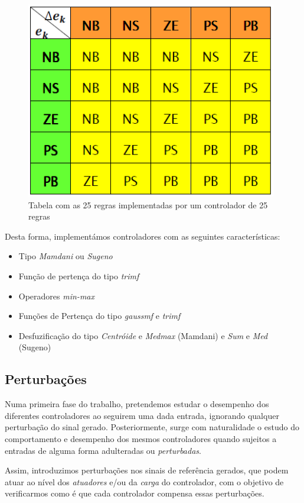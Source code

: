 \documentclass{article}
\begin{document}
\begin{figure}[H]
  \centering
      \includegraphics[scale=0.5]{Images/25_Rules.png}
  \caption{Tabela com as 25 regras implementadas por um controlador de 25 regras}
\end{figure}

Desta forma, implementámos controladores com as seguintes características:

\begin{itemize}
\item Tipo \emph{Mamdani} ou \emph{Sugeno}
\item Função de pertença do tipo \emph{trimf}
\item Operadores \emph{min-max}
\item Funções de Pertença do tipo \emph{gaussmf} e \emph{trimf}
\item Desfuzificação do tipo \emph{Centróide} e \emph{Medmax} (Mamdani) e \emph{Sum} e \emph{Med} (Sugeno)
\end{itemize}

\subsection{Perturbações}

Numa primeira fase do trabalho, pretendemos estudar o desempenho dos diferentes controladores ao seguirem uma dada entrada, ignorando qualquer perturbação do sinal gerado. Posteriormente, surge com naturalidade o estudo do comportamento e desempenho dos mesmos controladores quando sujeitos a entradas de alguma forma adulteradas ou \emph{perturbadas}.

Assim, introduzimos perturbações nos sinais de referência gerados, que podem atuar ao nível dos \emph{atuadores} e/ou da \emph{carga} do controlador, com o objetivo de verificarmos como é que cada controlador compensa essas perturbações.
\end{document}
